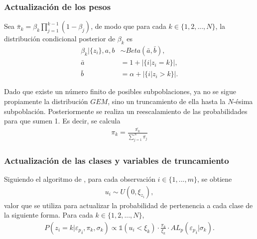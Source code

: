 \subsubsection{Actualizaci\'on de los pesos}

Sea $\bar{\pi}_k = \beta_k \prod_{j=1}^{k-1}(1 - \beta_j)$, de modo que para cada $k \in \{1,2,...,N\}$, la distribuci\'on condicional posterior de $\beta_k$ es
\begin{equation*}
\begin{aligned}
    \beta_k|\{z_i\}, a,b &\sim Beta(\bar{a}, \bar{b}), \\
    \bar{a} &= 1 + |\{i|z_i = k\}|, \\
    \bar{b} &= \alpha + |\{i|z_i > k\}|.
\end{aligned}
\end{equation*}

Dado que existe un n\'umero finito de posibles subpoblaciones, ya no se sigue propiamente la distribuci\'on $GEM$, sino un truncamiento de ella hasta la $N$-\'esima subpoblaci\'on. Posteriormente se realiza un reescalamiento de las probabilidades para que sumen 1. Es decir, se calcula
\begin{equation*}
\begin{aligned}
    \pi_k = \frac{\bar{\pi_k}}{\sum_{j=1}^N \bar{\pi_j}}
\end{aligned}
\end{equation*}

\subsubsection{Actualizaci\'on de las clases y variables de truncamiento}

Siguiendo el algoritmo de \cite{Kalli_Slice}, para cada observaci\'on $i \in \{1,...,m\}$, se obtiene
\begin{equation*}
\begin{aligned}
   u_i \sim U(0, \xi_{z_i}),
\end{aligned}
\end{equation*}
valor que se utiliza para actualizar la probabilidad de pertenencia a cada clase de la siguiente forma. Para cada $k \in \{1,2,...,N\}$,
\begin{equation*}
\begin{aligned}
   P(z_i = k| {\varepsilon_p}_i, \pi_k, \sigma_k)
   \propto
   \mathds{1}(u_i < \xi_k)
   \cdot
   \frac{\pi_k}{\xi_k}
   \cdot
   AL_p({\varepsilon_p}_i | \sigma_k).
\end{aligned}
\end{equation*}


